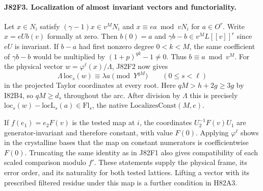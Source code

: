 \paragraph{J82F3. Localization of almost invariant vectors and functoriality.}
Let $x\in N_i$ satisfy $(\gamma-1)x\in v^MN_i$ and
$x\equiv ea\bmod vN_i$ for $a\in O^r$. Write $x=eU b(v)$
formally at zero. Then $b(0)=a$ and
$\gamma b-b\in v^ML[[v]]^r$ since $eU$ is invariant.
If $b-a$ had first nonzero degree $0<k<M$, the same coefficient
of $\gamma b-b$ would be multiplied by $(1+p)^{qk}-1\ne0$.
Thus $b\equiv a\bmod v^M$. For the physical vector
$w=\varphi^\ell(x)/\Lambda$, J82F2 now gives
\[
    \Lambda\,\mathrm{loc}_s(w)\equiv\lambda a\pmod{Y^{qM}}
             \qquad(0\le s<\ell)
\]
in the projected Taylor coordinates at every root.
Here $qM>h+2g\ge3g$ by I82B4, so $qM\ge d_s$ throughout
the arc. After division by $\Lambda$ this is precisely
$\mathrm{loc}_s(w)-\mathrm{locL}_s(a)\in\mathrm{Fl}_s$,
the native $\mathrm{LocalizesConst}(M,e)$.

If $f(e_1)=e_2 F(v)$ is the tested map at $i$, the coordinates
$U_2^{-1}F(v)U_1$ are generator-invariant and therefore constant,
with value $F(0)$. Applying $\varphi^\ell$ shows in the
crystalline bases that the map on constant numerators is
coefficientwise $F(0)$. Truncating the same identity as in
J82F1 also gives compatibility of each scaled comparison modulo
$f'$. These statements supply the physical frame, its error
order, and its naturality for both tested lattices. Lifting
a vector with its prescribed filtered residue under this map
is a further condition in H82A3.
